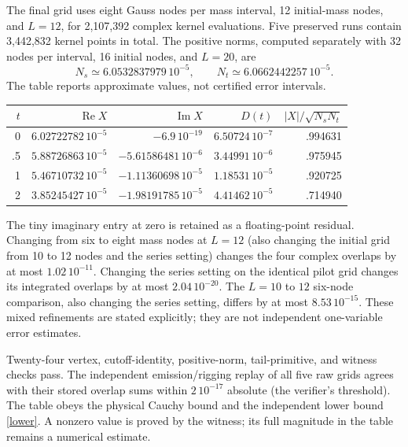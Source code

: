 The final grid uses eight Gauss nodes per mass interval, 12 initial-mass
nodes, and $L=12$, for 2,107,392 complex kernel evaluations.
Five preserved runs contain 3,442,832 kernel points in total.
The positive norms, computed separately with 32 nodes per interval,
16 initial nodes, and $L=20$, are
\[
 N_s\simeq6.0532837979\,10^{-5},\qquad
 N_t\simeq6.0662442257\,10^{-5}.
\]
The table reports approximate values, not certified error intervals.
\begin{center}
\begin{tabular}{rrrrr}
\toprule
$t$ & $\operatorname{Re}X$ & $\operatorname{Im}X$ & $D(t)$ & $|X|/\sqrt{N_sN_t}$\\
\midrule
0 & $6.02722782\,10^{-5}$ & $-6.9\,10^{-19}$ & $6.50724\,10^{-7}$ & .994631\\
.5 & $5.88726863\,10^{-5}$ & $-5.61586481\,10^{-6}$ & $3.44991\,10^{-6}$ & .975945\\
1 & $5.46710732\,10^{-5}$ & $-1.11360698\,10^{-5}$ & $1.18531\,10^{-5}$ & .920725\\
2 & $3.85245427\,10^{-5}$ & $-1.98191785\,10^{-5}$ & $4.41462\,10^{-5}$ & .714940\\
\bottomrule
\end{tabular}
\end{center}
The tiny imaginary entry at zero is retained as a floating-point residual.
Changing from six to eight mass nodes at $L=12$ (also changing the
initial grid from 10 to 12 nodes and the series setting) changes the
four complex overlaps by at most $1.02\,10^{-11}$.
Changing the series setting on the identical pilot grid changes its
integrated overlaps by at most $2.04\,10^{-20}$.
The $L=10$ to $12$ six-node comparison, also changing the series setting,
differs by at most $8.53\,10^{-15}$.
These mixed refinements are stated explicitly; they are not independent
one-variable error estimates.

Twenty-four vertex, cutoff-identity, positive-norm, tail-primitive, and
witness checks pass. The independent emission/rigging replay of all
five raw grids agrees with their stored overlap sums within
$2\,10^{-17}$ absolute (the verifier's threshold).
The table obeys the physical Cauchy bound and the independent lower
bound \eqref{lower}. A nonzero value is proved by the witness; its
full magnitude in the table remains a numerical estimate.
